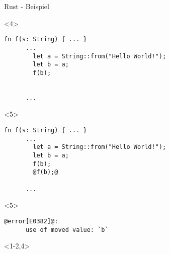 \begin{frame}[fragile]{Rust - Beispiel}

  \begin{onlyenv}<4> {
    \begin{lstlisting}[frame=single,style=base]
      fn f(s: String) { ... }
      ...
        let a = String::from("Hello World!");
        let b = a;
        f(b);


      ...
    \end{lstlisting}
  }
  \end{onlyenv}


  \begin{onlyenv}<5> {
    \begin{lstlisting}[frame=single,style=base]
      fn f(s: String) { ... }
      ...
        let a = String::from("Hello World!");
        let b = a;
        f(b);
        @f(b);@

      ...
    \end{lstlisting}
  }
  \end{onlyenv}

  \begin{onlyenv}<5> {
    \begin{lstlisting}[frame=single,style=base]
      @error[E0382]@:
      use of moved value: `b`
    \end{lstlisting}
  }
  \end{onlyenv}


  \begin{onlyenv}<1-2,4> {
    \begin{lstlisting}[frame=single,style=base]


    \end{lstlisting}
  }
  \end{onlyenv}

\end{frame}